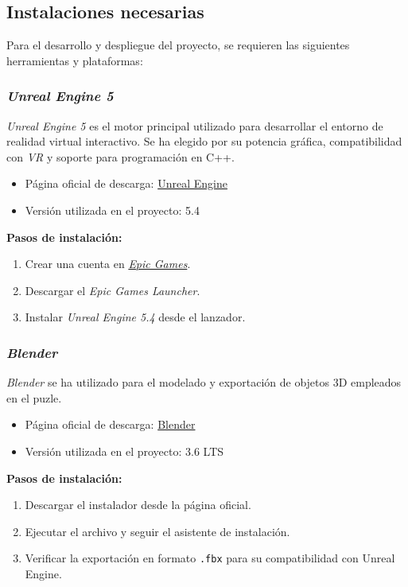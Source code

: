 \subsection{Instalaciones necesarias}

Para el desarrollo y despliegue del proyecto, se requieren las siguientes herramientas y plataformas:

\subsubsection*{\textit{Unreal Engine 5}}

\textit{Unreal Engine 5} es el motor principal utilizado para desarrollar el entorno de realidad virtual interactivo. Se ha elegido por su potencia gráfica, compatibilidad con \textit{VR} y soporte para programación en C++.

\begin{itemize}
    \item Página oficial de descarga: \href{https://www.unrealengine.com/download}{Unreal Engine}
    \item Versión utilizada en el proyecto: 5.4
\end{itemize}

\textbf{Pasos de instalación:}
\begin{enumerate}
    \item Crear una cuenta en \href{https://www.epicgames.com/site/es-ES/home}{\textit{Epic Games}}.
    \item Descargar el \textit{Epic Games Launcher}.
    \item Instalar \textit{Unreal Engine 5.4} desde el lanzador.
\end{enumerate}

\subsubsection*{\textit{Blender}}

\textit{Blender} se ha utilizado para el modelado y exportación de objetos 3D empleados en el puzle.

\begin{itemize}
    \item Página oficial de descarga: \href{https://www.blender.org/download/}{Blender}
    \item Versión utilizada en el proyecto: 3.6 LTS
\end{itemize}

\textbf{Pasos de instalación:}
\begin{enumerate}
    \item Descargar el instalador desde la página oficial.
    \item Ejecutar el archivo y seguir el asistente de instalación.
    \item Verificar la exportación en formato \texttt{.fbx} para su compatibilidad con Unreal Engine.
\end{enumerate}

